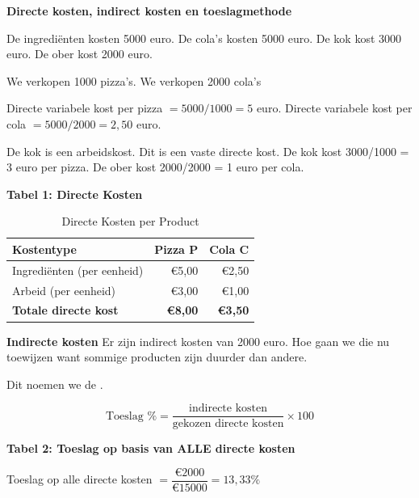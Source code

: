 \documentclass[a4paper,11pt]{article}
\begin{document}
\textbf{Directe kosten, indirect kosten en toeslagmethode}

De ingrediënten kosten 5000 euro.
De cola's kosten 5000 euro.
De kok kost 3000 euro.
De ober kost 2000 euro.

We verkopen 1000 pizza's.
We verkopen 2000 cola's

Directe variabele kost per pizza $= 5000/1000 = 5$ euro.
Directe variabele kost per cola $= 5000/2000 = 2{,}50$ euro.

De kok is een arbeidskost. Dit is een vaste directe kost.
De kok kost 3000/1000 = 3 euro per pizza.
De ober kost 2000/2000 = 1 euro per cola.

\textbf{Tabel 1: Directe Kosten}

\begin{table}[ht]
    \centering
    \begin{tabular}{|l|r|r|}
        \hline
        \textbf{Kostentype}          & \textbf{Pizza P} & \textbf{Cola C} \\
        \hline
        Ingrediënten (per eenheid)   & €5,00            & €2,50           \\
        Arbeid (per eenheid)         & €3,00            & €1,00           \\
        \hline
        \textbf{Totale directe kost} & \textbf{€8,00}   & \textbf{€3,50}  \\
        \hline
    \end{tabular}
    \caption{Directe Kosten per Product}
\end{table}

\textbf{Indirecte kosten}
Er zijn indirect kosten van 2000 euro.
Hoe gaan we die nu toewijzen want sommige producten zijn duurder
dan andere.

Dit noemen we de .

\[ \text{Toeslag \%} = \frac{\text{indirecte kosten}}{\text{gekozen directe kosten}} \times 100 \]
\newline

\textbf{Tabel 2: Toeslag op basis van ALLE directe kosten}

Toeslag op alle directe kosten $= \dfrac{\text{€}2000}{\text{€}15000} = 13{,}33\%$
\newline
\end{document}
